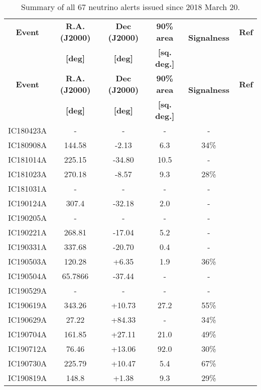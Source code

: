 \begin{longtable}[c]{||c c c c c c ||}
	\caption{Summary of all 67 neutrino alerts issued since 2018 March 20.} \label{tab:all_nu_alerts} \\
	\hline
	\textbf{Event} & \textbf{R.A. (J2000)} & \textbf{Dec (J2000)} & \textbf{90\% area} &~ \textbf{Signalness}& \textbf{Ref}\\
	& \textbf{[deg]}&\textbf{[deg]} & \textbf{[sq. deg.]} &&\\
	\hline
	\endfirsthead
	\hline
	\textbf{Event} & \textbf{R.A. (J2000)} & \textbf{Dec (J2000)} & \textbf{90\% area} &~ \textbf{Signalness}& \textbf{Ref}\\
	& \textbf{[deg]}&\textbf{[deg]} & \textbf{[sq. deg.]} &&\\
	\hline
	\endhead
	\hline
	\endfoot
	\hline
	\endlastfoot
	\hline%
	IC180423A & - & - & - & - & \cite{ic180423a} \\ 
	IC180908A & 144.58 & -2.13 & 6.3 & 34\% & \cite{ic180908a} \\ 
	IC181014A & 225.15 & -34.80 & 10.5 & - & \cite{ic181014a} \\ 
	IC181023A & 270.18 & -8.57 & 9.3 & 28\% & \cite{ic181023a} \\ 
	IC181031A & - & - & - & - & \cite{ic181031a} \\ 
	IC190124A & 307.4 & -32.18 & 2.0 & - & \cite{ic190124a} \\ 
	IC190205A & - & - & - & - & \cite{ic190205a} \\ 
	IC190221A & 268.81 & -17.04 & 5.2 & - & \cite{ic190221a} \\ 
	IC190331A & 337.68 & -20.70 & 0.4 & - & \cite{ic190331a} \\ 
	IC190503A & 120.28 & +6.35 & 1.9 & 36\% & \cite{ic190503a} \\ 
	IC190504A & 65.7866 & -37.44 & - & - & \cite{ic190504a} \\ 
	IC190529A & - & - & - & - & \cite{ic190529a} \\ 
	IC190619A & 343.26 & +10.73 & 27.2 & 55\% & \cite{ic190619a} \\ 
	IC190629A & 27.22 & +84.33 & - & 34\% & \cite{ic190629a} \\ 
	IC190704A & 161.85 & +27.11 & 21.0 & 49\% & \cite{ic190704a} \\ 
	IC190712A & 76.46 & +13.06 & 92.0 & 30\% & \cite{ic190712a} \\ 
	IC190730A & 225.79 & +10.47 & 5.4 & 67\% & \cite{ic190730a} \\ 
	IC190819A & 148.8 & +1.38 & 9.3 & 29\% & \cite{ic190819a} \\ 

\end{longtable}
